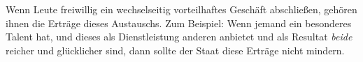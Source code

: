 Wenn Leute freiwillig ein wechselseitig vorteilhaftes Geschäft abschließen, gehören ihnen die Erträge dieses Austauschs.
Zum Beispiel: Wenn jemand ein besonderes Talent hat, und dieses als Dienstleistung anderen anbietet und als Resultat \emph{beide} reicher und glücklicher sind, dann sollte der Staat diese Erträge nicht mindern.